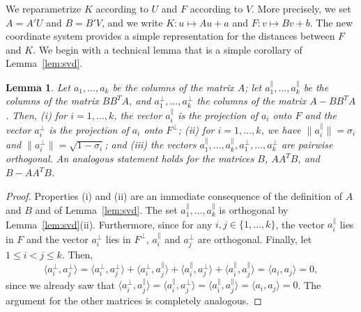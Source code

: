 \documentclass[a4paper,11pt]{paper}
\newtheorem{lemma}[theorem]{Lemma}
\begin{document}
We reparametrize $K$ according to $U$ and $F$ according to $V$.
More precisely, we set $A = A'U$ and $B = B'V$, and we write
$K: u \mapsto Au + a$ and $F: v \mapsto Bv + b$.
The new coordinate system provides
a simple representation for the distances between $F$ and $K$.
We begin with a technical lemma that is a simple corollary of
Lemma~\ref{lem:svd}.
\begin{lemma}\label{lem:matrices}
  Let $a_1, \dots, a_k$ be the columns of the matrix $A$;
  let $a_1^\parallel, \dots, a_k^{\parallel}$ be the columns of
  the matrix $BB^TA$, and $a_1^\perp, \dots, a_k^\perp$ the
  columns of the matrix $A - BB^TA$.
  Then, (i) for $i = 1, \dots, k$, the vector $a_i^\parallel$ is
  the projection of $a_i$ onto $F$ and the vector $a_i^\perp$
  is the projection of $a_i$ onto $F^\perp$;
  (ii) for $i = 1, \dots, k$, we have
  $\|a_i^\parallel\| = \sigma_i$ and
   $\|a_i^\perp\| = \sqrt{1-\sigma_i}$; and
  (iii) the vectors $a_1^\parallel, \dots, a_k^\parallel,
  a_1^\perp, \dots, a_k^\perp$ are pairwise orthogonal.
  An analogous statement holds for the matrices
  $B$, $AA^TB$, and $B - AA^TB$.
\end{lemma}
\begin{proof}
  Properties (i) and (ii) are an immediate consequence of the
  definition of $A$ and $B$ and of Lemma~\ref{lem:svd}.
  The set $a_1^\parallel, \dots, a_k^\parallel$ is orthogonal
  by Lemma~\ref{lem:svd}(ii). Furthermore, since for any
  $i,j \in \{1, \dots, k\}$, the vector
  $a_i ^\parallel$ lies in $F$ and the vector
  $a_i^\perp$ lies in $F^\perp$,
  $a_i^\parallel$ and $a_j^\perp$ are orthogonal.
  Finally, let $1 \leq i < j \leq k$. Then,
  \[
    \langle a_i^\perp, a_j^\perp\rangle
    =
    \langle a_i^\perp, a_j^\perp\rangle
    + \langle a_i^\perp, a_j^\parallel\rangle
    + \langle a_i^\parallel, a_j^\perp\rangle
    + \langle a_i^\parallel, a_j^\parallel\rangle
    = \langle a_i, a_j \rangle = 0,
  \]
  since we already saw that
  $\langle a_i^\perp, a_j^\parallel \rangle =
  \langle a_i^\parallel, a_j^\perp \rangle =
  \langle a_i^\parallel, a_j^\parallel \rangle =
  \langle a_i, a_j \rangle = 0$.
  The argument for the other matrices is
  completely analogous.
\end{proof}
\end{document}
